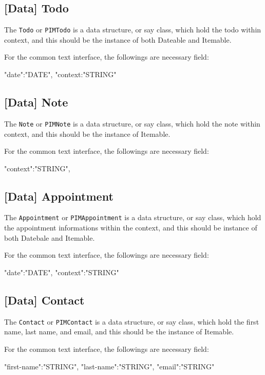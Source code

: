 \documentclass{article}
\begin{document}
    \subsection{[Data] Todo}
    The \lstinline|Todo| or \lstinline|PIMTodo| is a data structure, or say class, which hold the todo within context,
    and this should be the instance of both Dateable and Itemable.
    
    For the common text interface, the followings are necessary field: 
    \begin{json}
 {
     "date":"{DATE}",
     "context:"{STRING}"
 }
    \end{json} 
    
    \subsection{[Data] Note}
    The \lstinline|Note| or \lstinline|PIMNote| is a data structure, or say class, which hold the note within context,
    and this should be the instance of Itemable.
    
    For the common text interface, the followings are necessary field: 
    \begin{json}
 {
     "context":"{STRING}",
 }
    \end{json}
    
    \subsection{[Data] Appointment}
    The \lstinline|Appointment| or \lstinline|PIMAppointment| is a data structure, or say class,
    which hold the appointment informations within the context, and this should be instance of both Datebale and Itemable.
    
    For the common text interface, the followings are necessary field: 
    \begin{json}
 {
     "date":"{DATE}",
     "context":"{STRING}"
 }
    \end{json}
    
    \subsection{[Data] Contact}
    The \lstinline|Contact| or \lstinline|PIMContact| is a data structure, or say class, which hold the first name, last name,
    and email, and this should be the instance of Itemable.
    
    For the common text interface, the followings are necessary field: 
    \begin{json}
 {
     "first-name":"{STRING}",
     "last-name":"{STRING}",
     "email":"{STRING}"
 }
    \end{json}
    
\end{document}
